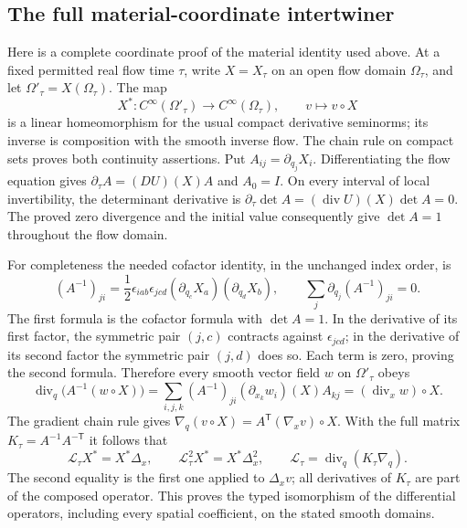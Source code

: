 \subsection{The full material-coordinate intertwiner}
\label{x4b:material}
Here is a complete coordinate proof of the material identity used above.
At a fixed permitted real flow time $\tau$, write $X=X_\tau$ on an
open flow domain $\Omega_\tau$, and let $\Omega'_\tau=X(\Omega_\tau)$.
The map
\[
 X^*:C^\infty(\Omega'_\tau)\longrightarrow C^\infty(\Omega_\tau),
 \qquad v\longmapsto v\circ X
\]
is a linear homeomorphism for the usual compact derivative seminorms;
its inverse is composition with the smooth inverse flow. The chain
rule on compact sets proves both continuity assertions. Put
$A_{ij}=\partial_{q_j}X_i$. Differentiating the flow equation gives
$\partial_\tau A=(DU)(X)A$ and $A_0=I$. On every interval of local
invertibility, the determinant derivative is
$\partial_\tau\det A=(\operatorname{div}U)(X)\det A=0$.
The proved zero divergence and the initial value consequently give
$\det A=1$ throughout the flow domain.

For completeness the needed cofactor identity, in the unchanged
index order, is
\[
 (A^{-1})_{ji}=\frac12\epsilon_{iab}\epsilon_{jcd}
                   (\partial_{q_c}X_a)(\partial_{q_d}X_b),\qquad
 \sum_j\partial_{q_j}(A^{-1})_{ji}=0.
\]
The first formula is the cofactor formula with $\det A=1$.
In the derivative of its first factor, the symmetric pair $(j,c)$
contracts against $\epsilon_{jcd}$; in the derivative of its second
factor the symmetric pair $(j,d)$ does so. Each term is zero, proving
the second formula. Therefore every smooth vector field $w$ on
$\Omega'_\tau$ obeys
\[
 \operatorname{div}_q\bigl(A^{-1}(w\circ X)\bigr)
 =\sum_{i,j,k}(A^{-1})_{ji}(\partial_{x_k}w_i)(X)A_{kj}
 =(\operatorname{div}_x w)\circ X.
\]
The gradient chain rule gives
$\nabla_q(v\circ X)=A^{\mathsf T}(\nabla_xv)\circ X$.
With the full matrix $K_\tau=A^{-1}A^{-\mathsf T}$ it follows that
\begin{equation}
 \mathcal L_\tau X^*=X^*\Delta_x,\qquad
 \mathcal L_\tau^2X^*=X^*\Delta_x^2,
 \qquad \mathcal L_\tau=\operatorname{div}_q(K_\tau\nabla_q).
 \label{x4b:operator}
\end{equation}
The second equality is the first one applied to $\Delta_xv$;
all derivatives of $K_\tau$ are part of the composed operator.
This proves the typed isomorphism of the differential operators,
including every spatial coefficient, on the stated smooth domains.

